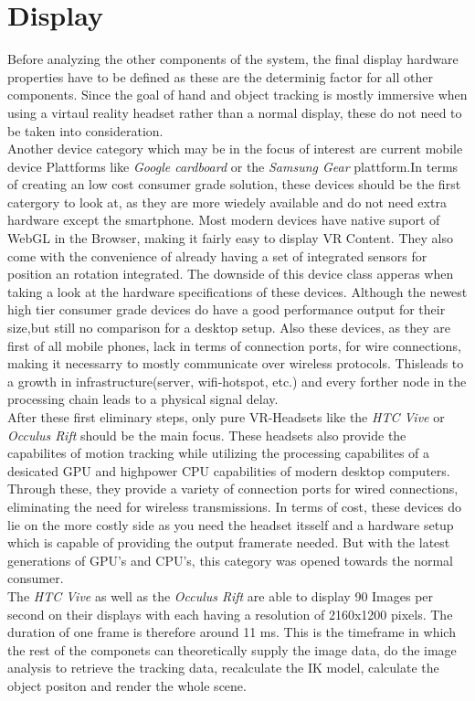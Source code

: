  \section{Display}
 Before analyzing the other components of the system, the final display hardware   properties have to be defined as these are the determinig factor for all other components. Since the goal of hand and object tracking is mostly immersive when using a virtaul reality headset rather than a normal display, these do not need to be taken into consideration.\\
Another device category which may be in the focus of interest are current mobile device Plattforms like \textit{Google cardboard} or the \textit{Samsung Gear} plattform.In terms of creating an low cost consumer grade solution, these devices should be the first catergory to look at, as they are more wiedely available and do not need extra hardware except the smartphone. Most modern devices have native suport of WebGL in the Browser, making it fairly easy to display VR Content. They also come with the convenience of already having a set of integrated sensors for position an rotation integrated. The downside of this device class apperas when taking a look at the hardware specifications of these devices. Although the newest high tier consumer grade devices do have a good performance output for their size,but still no comparison for a desktop setup.  Also these devices, as they are first of all mobile phones, lack in terms of connection ports, for wire connections, making it necessarry to mostly communicate over wireless protocols. Thisleads to a growth in  infrastructure(server, wifi-hotspot, etc.) and every forther node in the processing chain leads to a physical signal delay.\\
After these first eliminary steps, only pure VR-Headsets like the \textit{HTC Vive} or \textit{Occulus Rift}  should be the main focus. These headsets also provide the capabilites of motion tracking while utilizing the processing capabilites of a desicated GPU and highpower CPU capabilities of modern desktop computers. Through these, they provide a variety of connection ports for wired connections, eliminating the need for wireless transmissions. In terms of cost, these devices do lie on the more costly side as you need the headset itsself and a hardware setup which is capable of providing the output framerate needed. But with the latest generations of GPU's and CPU's, this category was opened towards the normal consumer.\\
The \textit{HTC Vive}  as well as the \textit{Occulus Rift} are able to display 90 Images per second on their displays with each having a resolution of 2160x1200 pixels. The duration of one frame is therefore around 11 ms. This is the timeframe in which the rest of the componets can theoretically supply the image data, do the image analysis to retrieve the tracking data, recalculate the IK model, calculate the object positon and render the whole scene.

